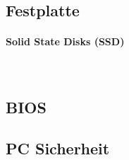 \subsection{Festplatte}

\paragraph{Solid State Disks (SSD)}~\\

\subsection{BIOS}

\subsection{PC Sicherheit}

